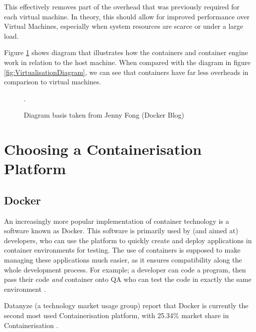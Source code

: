 This effectively removes part of the overhead that was previously required for each virtual machine. In theory, this should allow for improved performance over Virtual Machines, especially when system resources are scarce or under a large load.

Figure \ref{fig:ContainerDiagram} shows diagram that illustrates how the containers and container engine work in relation to the host machine. When compared with the diagram in figure \ref{fig:VirtualisationDiagram}, we can see that containers have far less overheads in comparison to virtual machines.

\begin{figure}[H]
\caption{Diagram basis taken from Jenny Fong (Docker Blog)\citep{ContainerDiagram}}.
\label{fig:ContainerDiagram}
\centering
\end{figure}

\section{Choosing a Containerisation Platform}
\subsection{Docker}%
An increasingly more popular implementation of container technology is a software known as Docker. This software is primarily used by (and aimed at) developers, who can use the platform to quickly create and deploy applications in container environments for testing. The use of containers is supposed to make managing these applications much easier, as it ensures compatibility along the whole development process. For example; a developer can code a program, then pass their code \emph{and} container onto QA who can test the code in exactly the same environment \citep{whydocker}.

Datanyze (a technology market usage group) report that Docker is currently the second most used Containerisation platform, with 25.34\% market share in Containerisation \citep{datanyze}. 
